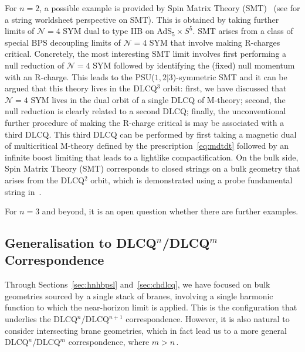 \documentclass[11pt]{article}
\newcommand{\CN}{\mathcal{N}}
\begin{document}
For $n=2$, a possible example is provided by Spin Matrix Theory (SMT)~\cite{Harmark:2014mpa,Harmark:2019zkn,Baiguera:2022pll} (see \cite{Harmark:2017rpg,Harmark:2018cdl, Harmark:2019upf, Harmark:2020vll,Roychowdhury:2020yun,Roychowdhury:2021wte,Bidussi:2021ujm, Bidussi:2023rfs} for a string worldsheet perspective on SMT).
This is obtained by taking further limits of $\mathcal{N}=4$ SYM dual to type IIB on AdS${}_5 \times S^5$. SMT arises from a class of special BPS decoupling limits of $\CN = 4$ SYM that involve making  R-charges critical. Concretely, the most interesting SMT limit involves first performing a null reduction of $\CN = 4$ SYM followed by identifying the (fixed) null momentum with an R-charge. This leads to the PSU($1,2|3$)-symmetric SMT and it can be argued that this theory lives in the DLCQ${}^3$ orbit: first, we have discussed that $\CN = 4$ SYM lives in the dual orbit of a single DLCQ of M-theory; second, the null reduction is clearly related to a second DLCQ; finally, the unconventional further procedure of making the R-charge critical is may be associated with a third DLCQ. This third DLCQ can be performed by first taking a magnetic dual of multicritical M-theory defined by the prescription~\eqref{eq:mdtdt} followed by an infinite boost limiting that leads to a lightlike compactification. On the bulk side, Spin Matrix Theory (SMT) corresponds to closed strings on a bulk geometry that arises from the DLCQ${}^2$ orbit, which is demonstrated using a probe fundamental string in~\cite{Blair:2023noj, Gomis:2023eav}. 

For $n=3$ and beyond, it is an open question whether there are further examples. 

\subsection{Generalisation to \texorpdfstring{DLCQ${}^n$/DLCQ${}^m$}{DLCQn/DLCQm} Correspondence} \label{sec:dlcqmn}

Through Sections~\ref{sec:hnhbpsl} and~\ref{sec:chdlcq}, we have focused on bulk geometries sourced by a single stack of branes, involving a single harmonic function to which the near-horizon limit is applied. This is the configuration that underlies the DLCQ${}^n$/DLCQ${}^{n+1}$ correspondence. However, it is also natural to consider intersecting brane geometries, which in fact lead us to a more general DLCQ${}^n$/DLCQ${}^{m}$ correspondence, where $m > n$\,. 
\end{document}
